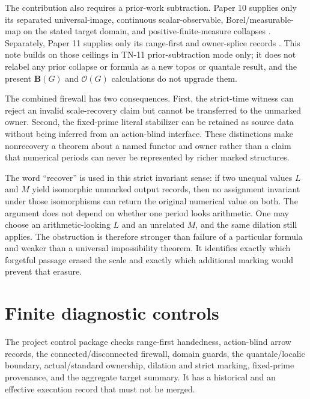 \documentclass[12pt]{article}
\theoremstyle{definition}
\newcommand{\B}{\mathbf B}
\newcommand{\Ocal}{\mathcal O}
\begin{document}
The contribution also requires a prior-work subtraction.  Paper 10 supplies only its separated universal-image, continuous scalar-observable, Borel/measurable-map on the stated target domain, and positive-finite-measure collapses \cite[claim ledger, lines~132--135; P10-1, lines~201--226; P10-2, lines~228--245; P10-3, lines~270--285; P10-4, lines~287--306]{wang2026reflections}.  Separately, Paper 11 supplies only its range-first and owner-splice records \cite[lines~255--277, 313--324, 337--405, and 1079--1087]{wang2026convolution}.  This note builds on those ceilings in TN-11 prior-subtraction mode only; it does not relabel any prior collapse or formula as a new topos or quantale result, and the present $\B(G)$ and $\Ocal(G)$ calculations do not upgrade them.

The combined firewall has two consequences.  First, the strict-time witness can reject an invalid scale-recovery claim but cannot be transferred to the unmarked owner.  Second, the fixed-prime literal stabilizer can be retained as source data without being inferred from an action-blind interface.  These distinctions make nonrecovery a theorem about a named functor and owner rather than a claim that numerical periods can never be represented by richer marked structures.

The word ``recover'' is used in this strict invariant sense: if two unequal values $L$ and $M$ yield isomorphic unmarked output records, then no assignment invariant under those isomorphisms can return the original numerical value on both.  The argument does not depend on whether one period looks arithmetic.  One may choose an arithmetic-looking $L$ and an unrelated $M$, and the same dilation still applies.  The obstruction is therefore stronger than failure of a particular formula and weaker than a universal impossibility theorem.  It identifies exactly which forgetful passage erased the scale and exactly which additional marking would prevent that erasure.

\section{Finite diagnostic controls}

The project control package checks range-first handedness, action-blind arrow records, the connected/disconnected firewall, domain guards, the quantale/localic boundary, actual/standard ownership, dilation and strict marking, fixed-prime provenance, and the aggregate target summary.  It has a historical and an effective execution record that must not be merged.
\end{document}
